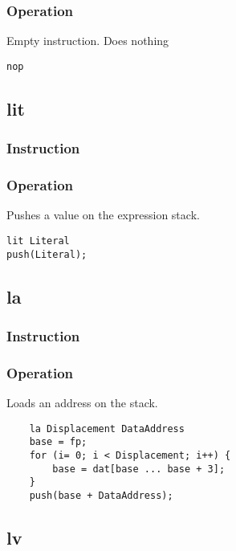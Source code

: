 \subsubsection{Operation}
Empty instruction. Does nothing

\begin{lstlisting}
nop
\end{lstlisting}

\subsection{lit}
\subsubsection{Instruction}

\subsubsection{Operation}
Pushes a value on the expression stack.

\begin{lstlisting}
lit Literal
push(Literal);
\end{lstlisting}

\subsection{la}
\subsubsection{Instruction}

\subsubsection{Operation}
Loads an address on the stack.

	\begin{lstlisting}
	la Displacement DataAddress
	base = fp;
	for (i= 0; i < Displacement; i++) {
		base = dat[base ... base + 3];
	}
	push(base + DataAddress);
	\end{lstlisting}

\subsection{lv}
